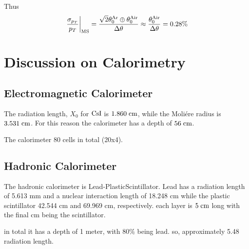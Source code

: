 \documentclass[a4paper,11pt,twoside]{article}
\begin{document}
Thus
\begin{equation}
  \left.\frac{\sigma_{p_T}}{p_T}\right|_{\rm MS}= \frac{\sqrt{2}\theta^{\rm Ar}_0\oplus \theta^{\rm Air}_0}{\Delta\theta}\approx
  \frac{\theta^{\rm Air}_0}{\Delta\theta}= 0.28\%
\end{equation}

\section{Discussion on Calorimetry}

\subsection{Electromagnetic Calorimeter}

The radiation length, $X_0$ for ${\rm CsI}$ is $1.860\;{\rm cm}$, while the Moli\'{e}re radius is $3.531\;{\rm cm}$.
For this reason the calorimeter has a depth of $56\;{\rm cm}$.

The calorimeter 80 cells in total (20x4).

\subsection{Hadronic Calorimeter}
The hadronic calorimeter is Lead-PlasticScintillator.
Lead has a radiation length of 5.613 mm and a nuclear interaction length of 18.248 cm
while the plastic scintillator 42.544 cm and 69.969 cm, respectively.
each layer is $5\;{\rm cm}$ long with the final cm being the scintillator.

in total it has a depth of 1 meter, with 80\% being lead. so, approximately 5.48 radiation length.
\end{document}
